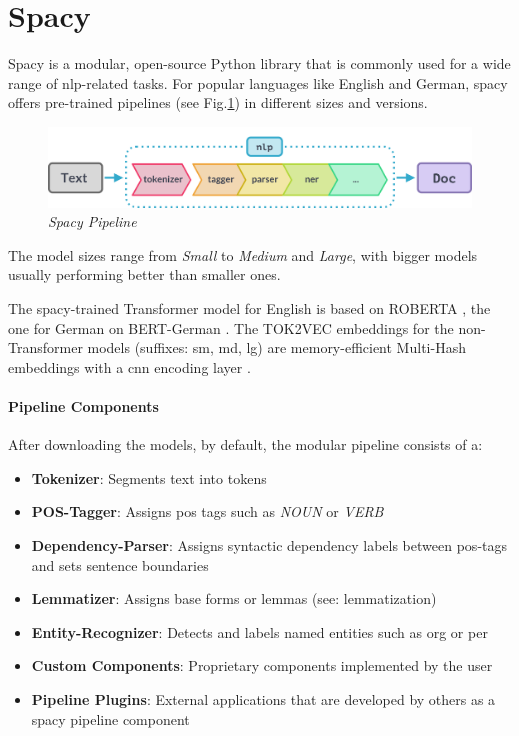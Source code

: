 \section{Spacy}\label{subsec:spacy}
Spacy \cite{spacy} is a modular, open-source Python library that is commonly used for a wide range of \gls{nlp}-related tasks.
For popular languages like English and German, spacy offers pre-trained pipelines (see Fig.\ref{fig:spacy-pipeline}) in different sizes and versions.
\begin{figure}[H]
	\centering
	\includegraphics[width=1.0\textwidth]{Assets/spacypipe}
	\caption{\textit{Spacy Pipeline}}
	\label{fig:spacy-pipeline}
\end{figure}

The model sizes range from \emph{Small} to \emph{Medium} and \emph{Large}, with bigger models usually performing better than smaller ones.

The spacy-trained Transformer model for English is based on \gls{ROBERTA} \cite{roberta}, the one for German on \gls{BERT}-German \cite{BERT}.
The TOK2VEC \cite{spacy} embeddings for the non-Transformer models (suffixes: sm, md, lg) are memory-efficient Multi-Hash embeddings \cite{spacyembeddings} with a \gls{cnn} encoding layer \cite{spacy}.

\paragraph{Pipeline Components}
After downloading the models, by default, the modular pipeline consists of a:

\begin{itemize}
  \item \textbf{Tokenizer}: Segments text into tokens
  \item \textbf{POS-Tagger}: Assigns \gls{pos} tags such as \textit{NOUN} or \textit{VERB}
  \item \textbf{Dependency-Parser}: Assigns syntactic dependency labels between \gls{pos}-tags and sets sentence boundaries
  \item \textbf{Lemmatizer}: Assigns base forms or lemmas (see: \gls{lemmatization})
  \item \textbf{Entity-Recognizer}: Detects and labels named entities such as \gls{org} or \gls{per}
  \item \textbf{Custom Components}: Proprietary components implemented by the user
  \item \textbf{Pipeline Plugins}: External applications that are developed by others as a spacy pipeline component
\end{itemize}

